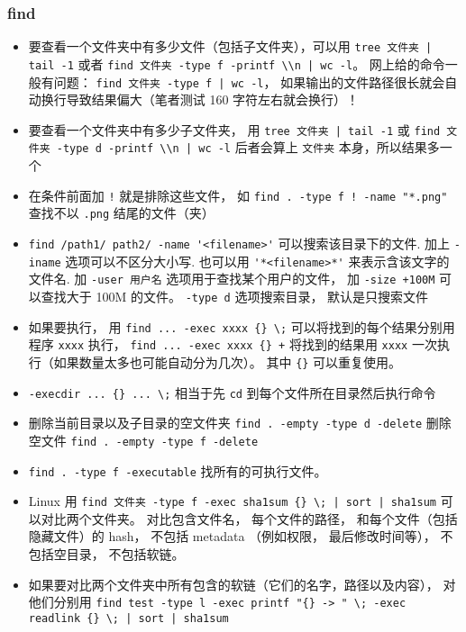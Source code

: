 \subsubsection{find}
\begin{itemize}
\item 要查看一个文件夹中有多少文件（包括子文件夹），可以用 \verb`tree 文件夹 | tail -1` 或者 \verb`find 文件夹 -type f -printf \\n | wc -l`。 网上给的命令一般有问题： \verb`find 文件夹 -type f | wc -l`， 如果输出的文件路径很长就会自动换行导致结果偏大（笔者测试 160 字符左右就会换行）！
\item 要查看一个文件夹中有多少子文件夹， 用 \verb`tree 文件夹 | tail -1` 或 \verb`find 文件夹 -type d -printf \\n | wc -l` 后者会算上 \verb`文件夹` 本身，所以结果多一个
\item 在条件前面加 \verb`!` 就是排除这些文件， 如 \verb`find . -type f ! -name "*.png"` 查找不以 \verb`.png` 结尾的文件（夹）
\item \verb`find /path1/ path2/ -name '<filename>'` 可以搜索该目录下的文件. 加上 \verb`-iname` 选项可以不区分大小写. 也可以用 \verb`'*<filename>*'` 来表示含该文字的文件名. 加 \verb`-user 用户名` 选项用于查找某个用户的文件， 加 \verb`-size +100M` 可以查找大于 100M 的文件。 \verb`-type d` 选项搜索目录， 默认是只搜索文件
\item 如果要执行， 用 \verb`find ... -exec xxxx {} \;` 可以将找到的每个结果分别用程序 \verb`xxxx` 执行， \verb`find ... -exec xxxx {} +` 将找到的结果用 \verb`xxxx` 一次执行（如果数量太多也可能自动分为几次）。 其中 \verb`{}` 可以重复使用。
\item \verb`-execdir ... {} ... \;` 相当于先 \verb`cd` 到每个文件所在目录然后执行命令
\item 删除当前目录以及子目录的空文件夹 \verb`find . -empty -type d -delete` 删除空文件 \verb`find . -empty -type f -delete`
\item \verb|find . -type f -executable| 找所有的可执行文件。
\item Linux 用 \verb`find 文件夹 -type f -exec sha1sum {} \; | sort | sha1sum` 可以对比两个文件夹。 对比包含文件名， 每个文件的路径， 和每个文件（包括隐藏文件）的 hash， 不包括 metadata （例如权限， 最后修改时间等）， 不包括空目录， 不包括软链。
\item 如果要对比两个文件夹中所有包含的软链（它们的名字，路径以及内容）， 对他们分别用 \verb`find test -type l -exec printf "{} -> " \; -exec readlink {} \; | sort | sha1sum`
\end{itemize}

